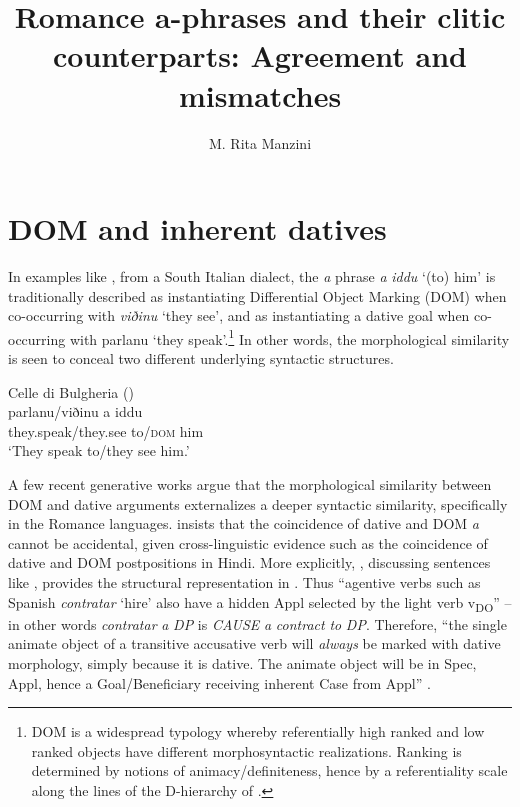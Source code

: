 \documentclass[output=paper,colorlinks,citecolor=brown,nonflat]{./langscibook}
\author{M. Rita Manzini\affiliation{Università di Firenze}}
\title{Romance a-phrases and their clitic counterparts: Agreement and mismatches}
\begin{document}
\maketitle 
{}



\section{DOM and inherent datives}\label{sec:manzini:1}

In examples like , from a South Italian dialect, the \textit{a} phrase \textit{a} \textit{iddu} ‘(to) him’ is traditionally described as instantiating Differential Object Marking (DOM) when co-occurring with \textit{viðinu} ‘they see’, and as instantiating a dative goal when co-occurring with {parlanu} ‘they speak’.\footnote{DOM is a widespread typology \citep{Bossong1985} whereby referentially high ranked and low ranked objects have different morphosyntactic realizations. Ranking is determined by notions of animacy/definiteness, hence by a referentiality scale along the lines of the D-hierarchy of \citet{Kiparsky2008}.}   In other words, the morphological similarity is seen to conceal two different underlying syntactic structures.

\ea%
    \label{ex:manzini:1}
    {Celle di Bulgheria (\citealt{ManziniSavoia2005})}\\
    \gll parlanu/viðinu a iddu\\
        they.speak/they.see to/\textsc{dom} him\\
    \glt ‘They speak to/they see him.’        
\z

A few recent generative works argue that the morphological similarity between DOM and dative arguments externalizes a deeper syntactic similarity, specifically in the Romance languages. \citet{Torrego1998} insists that the coincidence of dative and DOM \textit{a} cannot be accidental, given cross-linguistic evidence such as the coincidence of dative and DOM postpositions in Hindi. More explicitly, \citet{Torrego2010}, discussing sentences like , provides the structural representation in . Thus “agentive verbs such as Spanish \textit{contratar} ‘hire’ also have a hidden Appl selected by the light verb v\textsubscript{DO}” – in other words \textit{contratar} \textit{a} \textit{DP} is \textit{CAUSE} \textit{a} \textit{contract} \textit{to} \textit{DP}. Therefore, “the single animate object of a transitive accusative verb will \textit{always} be marked with dative morphology, simply because it is dative. The animate object will be in Spec, Appl, hence a Goal/Beneficiary receiving inherent Case from Appl” \citep[462]{Torrego2010}. 
\end{document}
